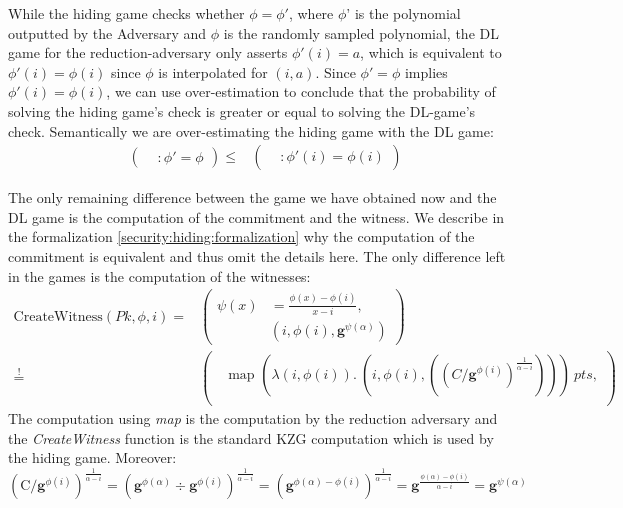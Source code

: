 While the hiding game checks whether $\phi=\phi'$, where $\phi$' is the polynomial outputted by the Adversary and  $\phi$ is the randomly sampled polynomial, the DL game for the reduction-adversary only asserts $\phi'(i)=a$, which is equivalent to $\phi'(i)=\phi(i)$ since $\phi$ is interpolated for $(i, a)$. Since $\phi'=\phi$ implies $\phi'(i)=\phi(i)$, we can use over-estimation to conclude that the probability of solving the hiding game's check is greater or equal to solving the DL-game's check. Semantically we are over-estimating the hiding game with the DL game: 
\begin{equation*}
    \begin{aligned}
        &\left(
            \begin{aligned}
                &: \phi'=\phi
            \end{aligned}
        \right)
        \le&\left(
            \begin{aligned}
                &: \phi'(i)=\phi(i)
            \end{aligned}
        \right)
    \end{aligned}
\end{equation*}

The only remaining difference between the game we have obtained now and the DL game is the computation of the commitment and the witness. We describe in the formalization \ref{security:hiding:formalization} why the computation of the commitment is equivalent and thus omit the details here. 
The only difference left in the games is the computation of the witnesses: 
\begin{equation*}
    \begin{aligned}
        \text{CreateWitness}(Pk,\phi,i)=&\left(
            \begin{aligned}
                \psi(x) &= \frac{\phi(x)-\phi(i)}{x-i}, \\
                & (i,\phi(i), \mathbf{g}^{\psi(\alpha)})
            \end{aligned}
        \right)\\
        \overset{!}{=}&\left(
            \begin{aligned}
                &\text{map } (\lambda (i,\phi(i)).\ (i,\phi(i), ((C/\mathbf{g}^{\phi(i)})^{\frac{1}{\alpha-i}})))\ pts,\\
            \end{aligned}
        \right)
    \end{aligned}
\end{equation*}
The computation using \textit{map} is the computation by the reduction adversary and the \textit{CreateWitness} function is the standard KZG computation which is used by the hiding game. Moreover: 
\begin{equation*}
    (\text{C} / \mathbf{g}^{\phi(i)})^{\frac{1}{\alpha-i}}
    = (\mathbf{g}^{\phi(\alpha)} \div \mathbf{g}^{\phi(i)})^{\frac{1}{\alpha-i}}
    = (\mathbf{g}^{\phi(\alpha)-\phi(i)})^{\frac{1}{\alpha-i}}
    = \mathbf{g}^{\frac{\phi(\alpha)-\phi(i)}{\alpha-i}}
    = \mathbf{g}^{\psi(\alpha)}
\end{equation*}


